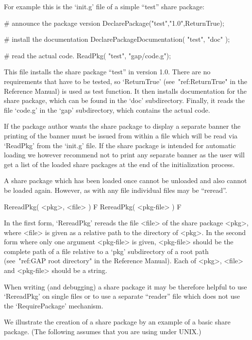 For example this is the `init.g' file of a simple ``test'' share package:

\begintt
# announce the package version
DeclarePackage("test","1.0",ReturnTrue);

# install the documentation
DeclarePackageDocumentation( "test", "doc" );

# read the actual code.
ReadPkg( "test", "gap/code.g");
\endtt

This file installs the share package ``test'' in version 1.0. There
are no requirements that have to be tested, so `ReturnTrue'
(see~"ref:ReturnTrue" in the Reference Manual) is used as
test function. It then installs documentation for the share package,
which can be found in the `doc' subdirectory. Finally, it reads the
file `code.g' in the `gap' subdirectory, which contains the actual
code.

If the package author wants the share package to display a separate
banner the printing of the banner must be issued from within a file
which will be read via `ReadPkg' from the `init.g' file. If the share
package is intended for automatic loading we however recommend not to print
any separate banner as the user will get a list of the loaded share packages
at the end of the initialization process.

A share package which has been loaded once
cannot be unloaded and also cannot be loaded again.
However, as with any file individual files may be ``reread''.

\>RereadPkg( <pkg>, <file> ) F
\>RereadPkg( <pkg-file> ) F

In the first form, `RereadPkg' rereads  the  file  <file>  of  the  share
package <pkg>, where <file> is given as a relative path to the  directory 
of <pkg>. In the second form where only one argument <pkg-file> is given,
<pkg-file> should be the complete path of a  file  relative  to  a  `pkg'
subdirectory of a {\GAP} root path (see~"ref:GAP root directory"  in  the
Reference Manual). Each of <pkg>,  <file>  and  <pkg-file>  should  be  a
string.

When  writing (and debugging) a share package it may be therefore
helpful to use  `RereadPkg' on single  files or to use a separate
``reader'' file which does not use the `RequirePackage' mechanism.


We illustrate the creation of a share package by an example of a basic
share package. (The following assumes that you are using {\GAP} under UNIX.)

